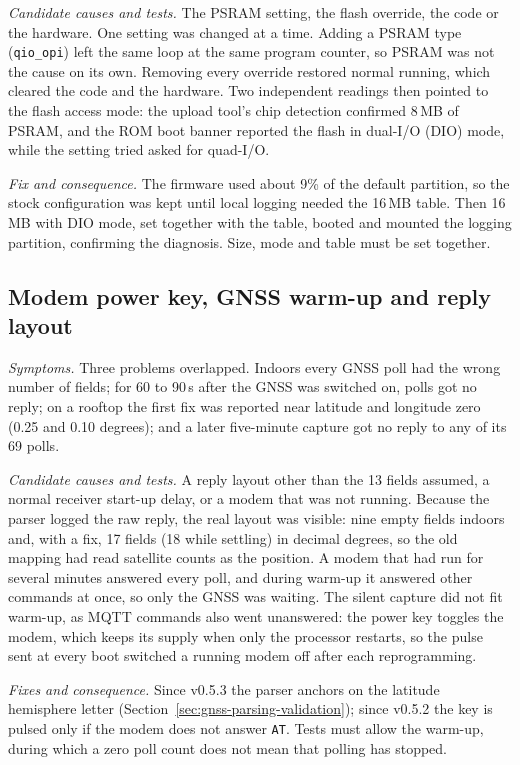 \emph{Candidate causes and tests.} The PSRAM setting, the flash override, the code or the hardware. One setting was changed at a time. Adding a PSRAM type (\texttt{qio\_opi}) left the same loop at the same program counter, so PSRAM was not the cause on its own. Removing every override restored normal running, which cleared the code and the hardware. Two independent readings then pointed to the flash access mode: the upload tool's chip detection confirmed 8\,MB of PSRAM, and the ROM boot banner reported the flash in dual-I/O (DIO) mode, while the setting tried asked for quad-I/O.

\emph{Fix and consequence.} The firmware used about 9\% of the default partition, so the stock configuration was kept until local logging needed the 16\,MB table. Then 16\,MB with DIO mode, set together with the table, booted and mounted the logging partition, confirming the diagnosis. Size, mode and table must be set together.

\subsection{Modem power key, GNSS warm-up and reply layout}
\label{sec:inv-gnss}

\emph{Symptoms.} Three problems overlapped. Indoors every GNSS poll had the wrong number of fields; for 60 to 90\,s after the GNSS was switched on, polls got no reply; on a rooftop the first fix was reported near latitude and longitude zero (0.25 and 0.10 degrees); and a later five-minute capture got no reply to any of its 69 polls.

\emph{Candidate causes and tests.} A reply layout other than the 13 fields assumed, a normal receiver start-up delay, or a modem that was not running. Because the parser logged the raw reply, the real layout was visible: nine empty fields indoors and, with a fix, 17 fields (18 while settling) in decimal degrees, so the old mapping had read satellite counts as the position. A modem that had run for several minutes answered every poll, and during warm-up it answered other commands at once, so only the GNSS was waiting. The silent capture did not fit warm-up, as MQTT commands also went unanswered: the power key toggles the modem, which keeps its supply when only the processor restarts, so the pulse sent at every boot switched a running modem off after each reprogramming.

\emph{Fixes and consequence.} Since v0.5.3 the parser anchors on the latitude hemisphere letter (Section~\ref{sec:gnss-parsing-validation}); since v0.5.2 the key is pulsed only if the modem does not answer \texttt{AT}. Tests must allow the warm-up, during which a zero poll count does not mean that polling has stopped.

